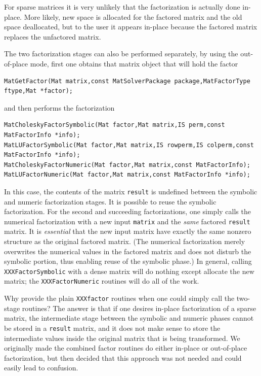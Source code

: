 {{For sparse matrices it is very unlikely that the factorization
is actually done in-place. More likely, new space is allocated
for the factored matrix and the old space deallocated, but to the
user it appears in-place because the factored matrix replaces
the unfactored matrix.

The 
two
factorization
stages
can also be performed separately, by using the out-of-place mode, first
one obtains that matrix object that will hold the factor
\begin{lstlisting}
MatGetFactor(Mat matrix,const MatSolverPackage package,MatFactorType ftype,Mat *factor);
\end{lstlisting}
and then performs the factorization
\begin{lstlisting}
MatCholeskyFactorSymbolic(Mat factor,Mat matrix,IS perm,const MatFactorInfo *info);
MatLUFactorSymbolic(Mat factor,Mat matrix,IS rowperm,IS colperm,const MatFactorInfo *info);
MatCholeskyFactorNumeric(Mat factor,Mat matrix,const MatFactorInfo);
MatLUFactorNumeric(Mat factor,Mat matrix,const MatFactorInfo *info);
\end{lstlisting}
In this case, the contents of the matrix \lstinline{result} is undefined between
the symbolic and numeric factorization stages.
It is possible to reuse the symbolic factorization. For the second and
succeeding factorizations, one simply calls the numerical factorization with a
new input \lstinline{matrix} and the {\em same} factored \lstinline{result} matrix.
It is {\em essential} that the new input matrix
have   %
exactly the same nonzero structure as the original factored matrix.
(The numerical factorization merely overwrites the numerical values in the
factored matrix and does not disturb the symbolic portion, thus enabling
reuse of the symbolic phase.)
In general, calling \lstinline{XXXFactorSymbolic} with a dense matrix will
do nothing except allocate the new matrix; the \lstinline{XXXFactorNumeric}
routines will do all of the work.

Why provide the plain \lstinline{XXXfactor} routines when one could simply
call the two-stage routines? The answer is that if one desires in-place
factorization of a sparse matrix, the intermediate stage between the
symbolic and numeric phases cannot be stored in a \lstinline{result} matrix, and
it does not make sense to store the intermediate values
inside the original matrix
that is being transformed.  We originally made the combined factor routines
do either in-place or out-of-place factorization, but then decided that
this approach was not needed and could easily lead to confusion.

}}
